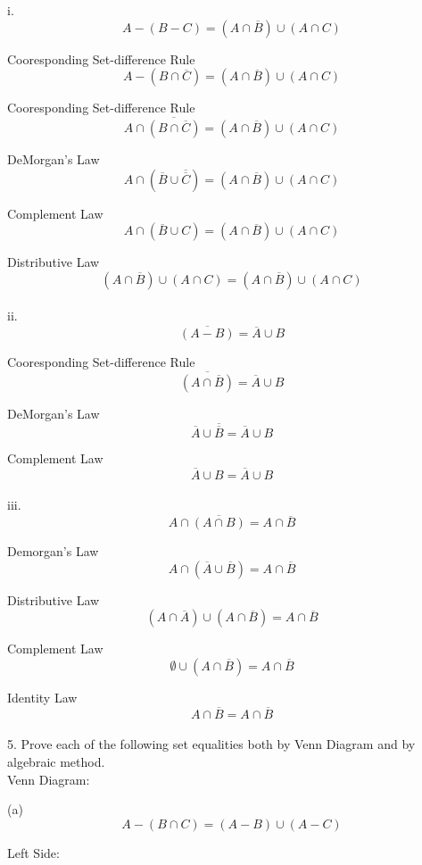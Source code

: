 \documentclass[10pt]{article}
\begin{document}
i.
$$A - (B - C) = (A \cap \overline{B}) \cup (A \cap C)$$

Cooresponding Set-difference Rule
$$A - (B \cap \overline{C}) = (A \cap \overline{B}) \cup (A \cap C)$$

Cooresponding Set-difference Rule
$$A \cap \overline{(B \cap \overline{C})} = (A \cap \overline{B}) \cup (A \cap C)$$

DeMorgan's Law
$$A \cap (\overline{B} \cup \overline{\overline{C}}) = (A \cap \overline{B}) \cup (A \cap C)$$

Complement Law
$$A \cap (\overline{B} \cup C) = (A \cap \overline{B}) \cup (A \cap C)$$

Distributive Law
$$(A \cap \overline{B}) \cup (A \cap C) = (A \cap \overline{B}) \cup (A \cap C)$$\\

ii. 
$$\overline{(A - B)} = \overline{A} \cup B$$

Cooresponding Set-difference Rule
$$\overline{(A \cap \overline{B})} = \overline{A} \cup B$$

DeMorgan's Law
$$\overline{A} \cup \overline{\overline{B}} = \overline{A} \cup B$$

Complement Law
$$\overline{A} \cup B = \overline{A} \cup B$$\\

iii.
$$A \cap \overline{(A \cap B)} = A \cap \overline {B}$$

Demorgan's Law
$$A \cap (\overline{A} \cup \overline{B}) = A \cap \overline {B}$$

Distributive Law
$$(A \cap \overline{A}) \cup (A \cap \overline{B}) = A \cap \overline {B}$$

Complement Law
$$\emptyset \cup (A \cap \overline{B}) = A \cap \overline {B}$$

Identity Law
$$A \cap \overline {B} = A \cap \overline {B}$$\\

5. Prove each of the following set equalities both by Venn Diagram and by algebraic method.\\

Venn Diagram:

(a)
$$A - (B \cap C) = (A - B) \cup (A - C)$$

Left Side:
\end{document}
